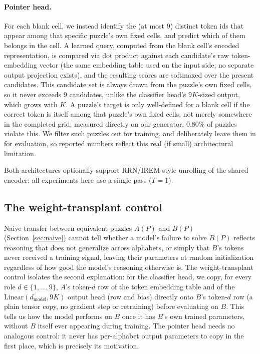 \documentclass{article} %
\begin{document}
\paragraph{Pointer head.} For each blank cell, we instead identify the
(at most 9) distinct token ids that appear among that specific puzzle's
own fixed cells, and predict which of them belongs in the cell. A
learned query, computed from the blank cell's encoded representation, is
compared via dot product against each candidate's raw token-embedding
vector (the same embedding table used on the input side; no separate
output projection exists), and the resulting scores are softmaxed over
the present candidates. This candidate set is always drawn from the
puzzle's own fixed cells, so it never exceeds 9 candidates, unlike the
classifier head's $9K$-sized output, which grows with $K$. A puzzle's
target is only well-defined for a blank cell if the correct token is
itself among that puzzle's own fixed cells, not merely somewhere in the
completed grid; measured directly on our generator, 0.80\% of puzzles
violate this. We filter such puzzles out for training, and deliberately
leave them in for evaluation, so reported numbers reflect this real (if
small) architectural
limitation.

Both architectures optionally support RRN/IREM-style unrolling
\citep{palm2018recurrent,du2022learning} of the shared encoder; all
experiments here use a single pass ($T=1$).

\subsection{The weight-transplant control}
\label{sec:transplant}

Naive transfer between equivalent puzzles $A(P)$ and $B(P)$
(Section~\ref{sec:naive}) cannot tell whether a model's failure to solve
$B(P)$ reflects reasoning that does not generalize across alphabets, or
simply that $B$'s tokens never received a training signal, leaving their
parameters at random initialization regardless of how good the model's
reasoning otherwise is. The weight-transplant control isolates the
second explanation: for the classifier head, we copy, for every role
$d \in \{1, \ldots, 9\}$, $A$'s token-$d$ row of the token embedding
table and of the $\mathrm{Linear}(d_{\text{model}}, 9K)$ output head
(row and bias) directly onto $B$'s token-$d$ row (a plain tensor copy,
no gradient step or retraining) before evaluating on $B$. This tells us
how the model performs on $B$ once it has $B$'s own trained parameters,
without $B$ itself ever appearing during training. The pointer head
needs no analogous control: it never has per-alphabet output parameters
to copy in the first place, which is precisely its motivation.
\end{document}
